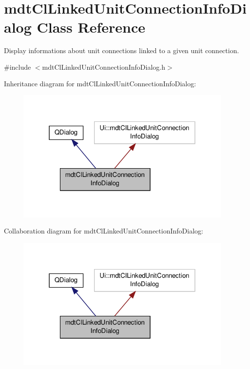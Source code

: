 \hypertarget{classmdt_cl_linked_unit_connection_info_dialog}{\section{mdt\-Cl\-Linked\-Unit\-Connection\-Info\-Dialog Class Reference}
\label{classmdt_cl_linked_unit_connection_info_dialog}
}


Display informations about unit connections linked to a given unit connection.  




{\ttfamily \#include $<$mdt\-Cl\-Linked\-Unit\-Connection\-Info\-Dialog.\-h$>$}



Inheritance diagram for mdt\-Cl\-Linked\-Unit\-Connection\-Info\-Dialog\-:
\nopagebreak
\begin{figure}[H]
\begin{center}
\leavevmode
\includegraphics[width=304pt]{classmdt_cl_linked_unit_connection_info_dialog__inherit__graph}
\end{center}
\end{figure}


Collaboration diagram for mdt\-Cl\-Linked\-Unit\-Connection\-Info\-Dialog\-:
\nopagebreak
\begin{figure}[H]
\begin{center}
\leavevmode
\includegraphics[width=304pt]{classmdt_cl_linked_unit_connection_info_dialog__coll__graph}
\end{center}
\end{figure}
